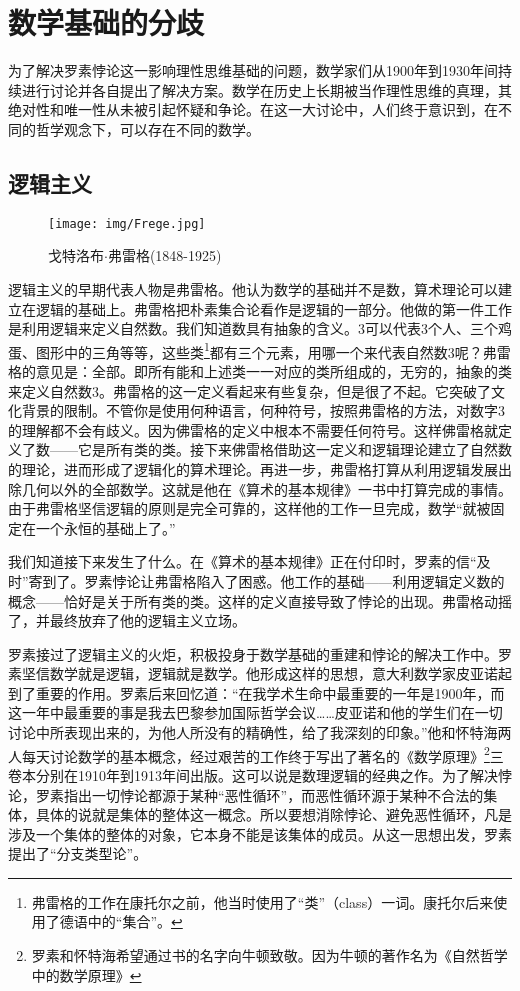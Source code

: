 \documentclass[b5paper]{ctexart}
\begin{document}
\section{数学基础的分歧}

为了解决罗素悖论这一影响理性思维基础的问题，数学家们从1900年到1930年间持续进行讨论并各自提出了解决方案。数学在历史上长期被当作理性思维的真理，其绝对性和唯一性从未被引起怀疑和争论。在这一大讨论中，人们终于意识到，在不同的哲学观念下，可以存在不同的数学。

\subsection{逻辑主义}

\begin{wrapfigure}{L}{0.3\textwidth}
 \centering
 \texttt{[image: img/Frege.jpg]}
 \caption{戈特洛布$\cdot$弗雷格(1848-1925)}
 \label{fig:Frege}
\end{wrapfigure}

逻辑主义的早期代表人物是弗雷格。他认为数学的基础并不是数，算术理论可以建立在逻辑的基础上。弗雷格把朴素集合论看作是逻辑的一部分。他做的第一件工作是利用逻辑来定义自然数。我们知道数具有抽象的含义。3可以代表3个人、三个鸡蛋、图形中的三角等等，这些类\footnote{弗雷格的工作在康托尔之前，他当时使用了“类”（class）一词。康托尔后来使用了德语中的“集合”。}都有三个元素，用哪一个来代表自然数3呢？弗雷格的意见是：全部。即所有能和上述类一一对应的类所组成的，无穷的，抽象的类来定义自然数3。弗雷格的这一定义看起来有些复杂，但是很了不起。它突破了文化背景的限制。不管你是使用何种语言，何种符号，按照弗雷格的方法，对数字3的理解都不会有歧义。因为佛雷格的定义中根本不需要任何符号。这样佛雷格就定义了数——它是所有类的类。接下来佛雷格借助这一定义和逻辑理论建立了自然数的理论，进而形成了逻辑化的算术理论。再进一步，弗雷格打算从利用逻辑发展出除几何以外的全部数学。这就是他在《算术的基本规律》一书中打算完成的事情。由于弗雷格坚信逻辑的原则是完全可靠的，这样他的工作一旦完成，数学“就被固定在一个永恒的基础上了。”

我们知道接下来发生了什么。在《算术的基本规律》正在付印时，罗素的信“及时”寄到了。罗素悖论让弗雷格陷入了困惑。他工作的基础——利用逻辑定义数的概念——恰好是关于所有类的类。这样的定义直接导致了悖论的出现。弗雷格动摇了，并最终放弃了他的逻辑主义立场。

罗素接过了逻辑主义的火炬，积极投身于数学基础的重建和悖论的解决工作中。罗素坚信数学就是逻辑，逻辑就是数学。他形成这样的思想，意大利数学家皮亚诺起到了重要的作用。罗素后来回忆道：“在我学术生命中最重要的一年是1900年，而这一年中最重要的事是我去巴黎参加国际哲学会议……皮亚诺和他的学生们在一切讨论中所表现出来的，为他人所没有的精确性，给了我深刻的印象。”他和怀特海两人每天讨论数学的基本概念，经过艰苦的工作终于写出了著名的《数学原理》\footnote{罗素和怀特海希望通过书的名字向牛顿致敬。因为牛顿的著作名为《自然哲学中的数学原理》}三卷本分别在1910年到1913年间出版。这可以说是数理逻辑的经典之作。为了解决悖论，罗素指出一切悖论都源于某种“恶性循环”，而恶性循环源于某种不合法的集体，具体的说就是集体的整体这一概念。所以要想消除悖论、避免恶性循环，凡是涉及一个集体的整体的对象，它本身不能是该集体的成员。从这一思想出发，罗素提出了“分支类型论”。
\end{document}
